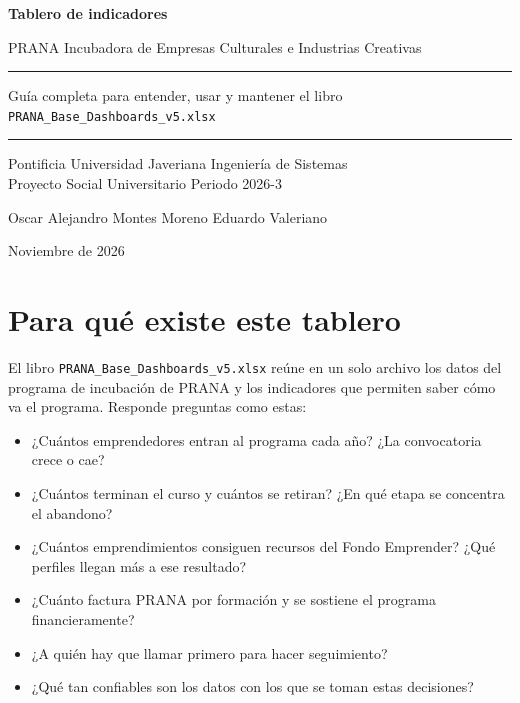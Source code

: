\documentclass[11pt,a4paper]{article}
\begin{document}
\begin{titlepage}
  \centering
  \vspace*{3cm}
  {\Huge\bfseries Tablero de indicadores\par}
  \vspace{0.4cm}
  {\LARGE PRANA Incubadora de Empresas Culturales e Industrias Creativas\par}
  \vspace{1.6cm}
  \rule{0.6\linewidth}{0.6pt}\par
  \vspace{0.6cm}
  {\Large Guía completa para entender, usar y mantener el libro \texttt{PRANA\_Base\_Dashboards\_v5.xlsx}\par}
  \vspace{0.6cm}
  \rule{0.6\linewidth}{0.6pt}\par
  \vfill
  {\large Pontificia Universidad Javeriana \textperiodcentered{} Ingeniería de Sistemas\\
  Proyecto Social Universitario \textperiodcentered{} Periodo 2026-3\par}
  \vspace{0.8cm}
  {\normalsize Oscar Alejandro Montes Moreno \textperiodcentered{} Eduardo Valeriano\par}
  \vspace{0.4cm}
  {\normalsize Noviembre de 2026\par}
\end{titlepage}

\tableofcontents
\newpage

\section{Para qué existe este tablero}

El libro \texttt{PRANA\_Base\_Dashboards\_v5.xlsx} reúne en un solo archivo los datos del programa de incubación de PRANA y los indicadores que permiten saber cómo va el programa. Responde preguntas como estas:

\begin{itemize}[leftmargin=1.4em]
  \item ¿Cuántos emprendedores entran al programa cada año? ¿La convocatoria crece o cae?
  \item ¿Cuántos terminan el curso y cuántos se retiran? ¿En qué etapa se concentra el abandono?
  \item ¿Cuántos emprendimientos consiguen recursos del Fondo Emprender? ¿Qué perfiles llegan más a ese resultado?
  \item ¿Cuánto factura PRANA por formación y se sostiene el programa financieramente?
  \item ¿A quién hay que llamar primero para hacer seguimiento?
  \item ¿Qué tan confiables son los datos con los que se toman estas decisiones?
\end{itemize}
\end{document}
